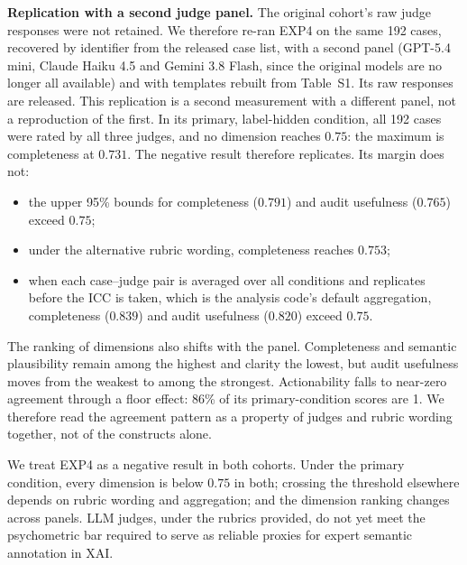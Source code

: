 \documentclass[fleqn,10pt,lineno]{wlpeerj}
\begin{document}
\textbf{Replication with a second judge panel.} The original cohort's raw
judge responses were not retained. We therefore re-ran EXP4 on the same 192
cases, recovered by identifier from the released case list, with a second
panel (GPT-5.4 mini, Claude Haiku 4.5 and Gemini 3.8 Flash, since the
original models are no longer all available) and with templates rebuilt from
Table~S1. Its raw responses are released. This replication is a
second measurement with a different panel, not a reproduction of the first.
In its primary, label-hidden condition, all 192 cases were rated by all three
judges, and no dimension reaches $0.75$: the maximum is completeness at
$0.731$. The negative result therefore replicates. Its margin does not:
\begin{itemize}
\item the upper 95\% bounds for completeness ($0.791$) and audit usefulness
  ($0.765$) exceed $0.75$;
\item under the alternative rubric wording, completeness reaches $0.753$;
\item when each case--judge pair is averaged over all conditions and
  replicates before the ICC is taken, which is the analysis code's default
  aggregation, completeness ($0.839$) and audit usefulness ($0.820$) exceed
  $0.75$.
\end{itemize}
The ranking of dimensions also shifts with the panel. Completeness and semantic
plausibility remain among the highest and clarity the lowest, but audit
usefulness moves from the weakest to among the strongest. Actionability falls
to near-zero agreement through a floor effect: 86\% of its primary-condition
scores are 1. We therefore read the agreement pattern as a property of judges and rubric
wording together, not of the constructs alone.

We treat EXP4 as a negative result in both cohorts. Under the primary
condition, every dimension is below $0.75$ in both; crossing the threshold
elsewhere depends on rubric wording and aggregation; and the dimension
ranking changes across panels. LLM judges, under the rubrics provided, do not
yet meet the psychometric bar required to serve as reliable proxies for
expert semantic annotation in XAI.
\end{document}

